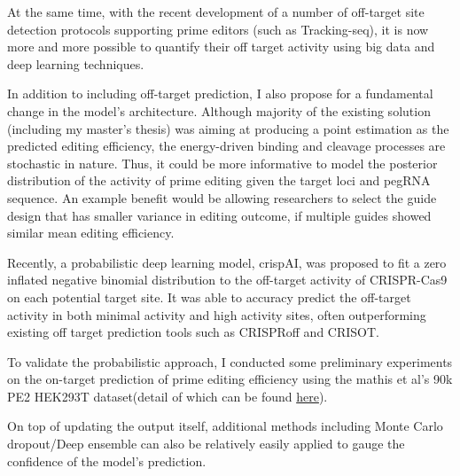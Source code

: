 \documentclass[a4,12pt]{article}
\begin{document}
At the same time, with the recent development of a number of off-target site detection protocols supporting prime editors (such as Tracking-seq), it is now more and more possible to quantify their off target activity using big data and deep learning techniques\parencite{liangGenomewideProfilingPrime2023,
zhuTrackingseqRevealsHeterogeneity2024}.

In addition to including off-target prediction, I also propose for a fundamental change in the model's architecture. Although majority of the existing solution (including my master's thesis) was aiming at producing a point estimation as the predicted editing efficiency\parencite{mathisMachineLearningPrediction2024,yuPredictionEfficienciesDiverse2023,koeppelPredictionPrimeEditing2023}, the energy-driven binding and cleavage processes are stochastic in nature\cite{stortzPiCRISPRPhysicallyInformed2023}. Thus, it could be more informative to model the posterior distribution of the activity of prime editing given the target loci and pegRNA sequence. An example benefit would be allowing researchers to select the guide design that has smaller variance in editing outcome, if multiple guides showed similar mean editing efficiency.

Recently, a probabilistic deep learning model, crispAI, was proposed to fit a zero inflated negative binomial distribution to the off-target activity of CRISPR-Cas9 on each potential target site\parencite{ozdenLearningQuantifyUncertainty2024}. It was able to accuracy predict the off-target activity in both minimal activity and high activity sites, often outperforming existing off target prediction tools such as CRISPRoff and CRISOT.

To validate the probabilistic approach, I conducted some preliminary experiments on the on-target prediction of prime editing efficiency using the mathis et al's 90k PE2 HEK293T dataset(detail of which can be found \href{https://github.com/PeihengLu/PEOff/blob/main/txt/preliminary/preliminary.pdf}{here})\parencite{mathisPredictingPrimeEditing2023}. 


On top of updating the output itself, additional methods including Monte Carlo dropout\parencite{galDropoutBayesianApproximation2016}/Deep ensemble can also be relatively easily applied to gauge the confidence of the model's prediction.
\end{document}
